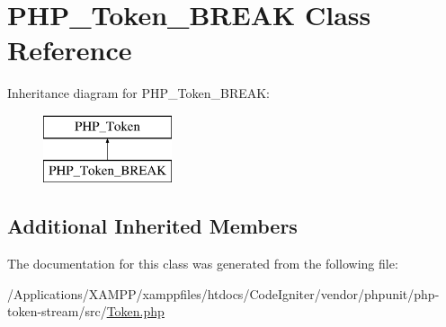 \hypertarget{class_p_h_p___token___b_r_e_a_k}{}\section{P\+H\+P\+\_\+\+Token\+\_\+\+B\+R\+E\+AK Class Reference}
\label{class_p_h_p___token___b_r_e_a_k}
Inheritance diagram for P\+H\+P\+\_\+\+Token\+\_\+\+B\+R\+E\+AK\+:\begin{figure}[H]
\begin{center}
\leavevmode
\includegraphics[height=2.000000cm]{class_p_h_p___token___b_r_e_a_k}
\end{center}
\end{figure}
\subsection*{Additional Inherited Members}


The documentation for this class was generated from the following file\+:\begin{DoxyCompactItemize}
\item 
/\+Applications/\+X\+A\+M\+P\+P/xamppfiles/htdocs/\+Code\+Igniter/vendor/phpunit/php-\/token-\/stream/src/\mbox{\hyperlink{_token_8php}{Token.\+php}}\end{DoxyCompactItemize}
